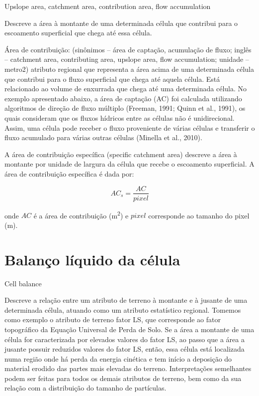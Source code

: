 \documentclass[]{book}
\begin{document}
Upslope area, catchment area, contribution area, ﬂow accumulation

Descreve a área à montante de uma determinada célula que contribui para
o escoamento superﬁcial que chega até essa célula.

Área de contribuição: (sinônimos -- área de captação, acumulação de
fluxo; inglês -- catchment area, contributing area, upslope area, flow
accumulation; unidade -- metro2) atributo regional que representa a área
acima de uma determinada célula que contribui para o fluxo superficial
que chega até aquela célula. Está relacionado ao volume de enxurrada que
chega até uma determinada célula. No exemplo apresentado abaixo, a área
de captação (AC) foi calculada utilizando algoritmos de direção de fluxo
múltiplo (Freeman, 1991; Quinn et al., 1991), os quais consideram que os
fluxos hídricos entre as células não é unidirecional. Assim, uma célula
pode receber o fluxo proveniente de várias células e transferir o fluxo
acumulado para várias outras células (Minella et al., 2010).

A área de contribuição especíﬁca (speciﬁc catchment area) descreve a
área à montante por unidade de largura da célula que recebe o escoamento
superﬁcial. A área de contribuição específica é dada por:

\[AC_s = \frac{AC}{pixel}\]

onde \(AC\) é a área de contribuição (m\textsuperscript{2}) e \(pixel\)
corresponde ao tamanho do pixel (m).

\section{Balanço líquido da célula}\label{balanco-liquido-da-celula}

Cell balance

Descreve a relação entre um atributo de terreno à montante e à jusante
de uma determinada célula, atuando como um atributo estatístico
regional. Tomemos como exemplo o atributo de terreno fator LS, que
corresponde ao fator topográfico da Equação Universal de Perda de Solo.
Se a área a montante de uma célula for caracterizada por elevados
valores do fator LS, ao passo que a área a jusante possuir reduzidos
valores do fator LS, então, essa célula está localizada numa região onde
há perda da energia cinética e tem início a deposição do material
erodido das partes mais elevadas do terreno. Interpretações semelhantes
podem ser feitas para todos os demais atributos de terreno, bem como da
sua relação com a distribuição do tamanho de partículas.
\end{document}
